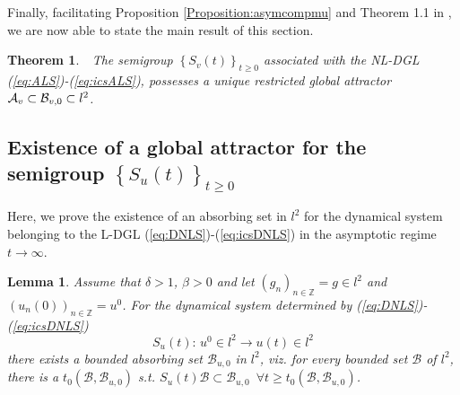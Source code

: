 \documentclass[preprintnumbers,amsmath,amssymb]{revtex4}
\newtheorem{theorem}{Theorem}[section]
\newtheorem{lemma}{Lemma}[section]
\begin{document}
\vspace*{0.5cm}


Finally, facilitating Proposition \ref{Proposition:asymcompmu} and Theorem 1.1 in \cite{Temam}, we are now able to state the main result of this section.

\begin{theorem}
 {\it \,\,
 The semigroup $\left\{S_v(t)\right\}_{t\ge 0}$ associated with the NL-DGL  (\ref{eq:ALS})-(\ref{eq:icsALS}), possesses a unique restricted global attractor ${\cal A}_v\subset \mathcal{B}_{v,0}\subset l^2$.}\label{Theorem:attractorALS}
 \end{theorem}
 
\subsection{Existence of a global attractor for the semigroup $\left\{S_u(t)\right\}_{t\ge 0}$}\label{section:Au}
Here, we prove the existence of an absorbing set in $l^2$ for the dynamical system belonging to the L-DGL (\ref{eq:DNLS})-(\ref{eq:icsDNLS}) in the asymptotic regime $t \rightarrow \infty$.

 
\begin{lemma}
Assume that  $\delta>1$, $\beta>0$ and let $(g_n)_{n\in {\mathbb{Z}}}=g \in l^2$ and $(u_n(0))_{n\in {\mathbb{Z}}}=u^0$. For the dynamical system determined by (\ref{eq:DNLS})-(\ref{eq:icsDNLS})
\begin{equation}
 S_u(t):\,u^0\in l^2\rightarrow u(t)\in l^2
\end{equation}
there exists  a bounded absorbing set $\mathcal{B}_{u,0}$ in $l^2$, viz. for every bounded set $\mathcal{B}$ of $l^2$, there is a $t_0(\mathcal{B},\mathcal{B}_{u,0})$ s.t.  
$S_u(t)\mathcal{B}\subset \mathcal{B}_{u,0}\,\,\,\forall t\ge t_0(\mathcal{B},\mathcal{B}_{u,0})$. 
\label{Lemma:asymboundgamma}
\end{lemma}

\end{document}
